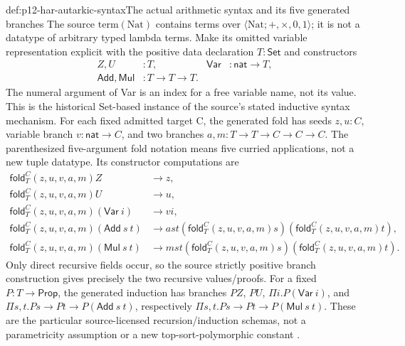 \begin{hbdefinition}{def:p12-har-autarkic-syntax}{The actual arithmetic syntax and its five generated branches}
The source \(\mathrm{term}(\mathrm{Nat})\) contains terms over
\(\langle\mathrm{Nat};+,\times,0,1\rangle\); it is not a datatype
of arbitrary typed lambda terms. Make its omitted variable representation
explicit with the positive data declaration \(T:\mathsf{Set}\) and
constructors
\[
\begin{aligned}
 Z,U&:T,&\mathsf{Var}&:\mathsf{nat}\to T,\\
 \mathsf{Add},\mathsf{Mul}&:T\to T\to T.
\end{aligned}
\]
The numeral argument of Var is an index for a free variable name, not its
value. This is the historical Set-based instance of the source's stated
inductive syntax mechanism. For each fixed admitted target C, the generated
fold has seeds \(z,u:C\), variable branch \(v:\mathsf{nat}\to C\),
and two branches \(a,m:T\to T\to C\to C\to C\).
The parenthesized five-argument fold notation means five curried
applications, not a new tuple datatype. Its constructor computations are
\[
\begin{aligned}
 \mathsf{fold}_T^C(z,u,v,a,m)Z&\longrightarrow z,\\
 \mathsf{fold}_T^C(z,u,v,a,m)U&\longrightarrow u,\\
 \mathsf{fold}_T^C(z,u,v,a,m)(\mathsf{Var}\ i)&\longrightarrow v i,\\
 \mathsf{fold}_T^C(z,u,v,a,m)(\mathsf{Add}\ s\ t)&\longrightarrow
    a s t(\mathsf{fold}_T^C(z,u,v,a,m)s)(\mathsf{fold}_T^C(z,u,v,a,m)t),\\
 \mathsf{fold}_T^C(z,u,v,a,m)(\mathsf{Mul}\ s\ t)&\longrightarrow
    m s t(\mathsf{fold}_T^C(z,u,v,a,m)s)(\mathsf{fold}_T^C(z,u,v,a,m)t).
\end{aligned}
\]
Only direct recursive fields occur, so the source strictly positive
branch construction gives precisely the two recursive values/proofs.
For a fixed \(P:T\to\mathsf{Prop}\), the generated induction has
branches \(PZ\), \(PU\), \(\Pi i.P(\mathsf{Var}\ i)\), and
\(\Pi s,t.Ps\to Pt\to P(\mathsf{Add}\ s\ t)\), respectively
\(\Pi s,t.Ps\to Pt\to P(\mathsf{Mul}\ s\ t)\).
These are the particular source-licensed recursion/induction schemas,
not a parametricity assumption or a new top-sort-polymorphic constant
\cite[pp.~1206--1209,1221--1222]{BarendregtGeuvers2001}.
\end{hbdefinition}

